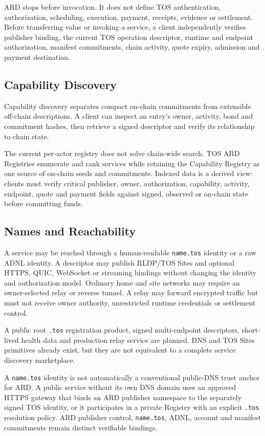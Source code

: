 \documentclass[11pt,oneside]{article}
\begin{document}
ARD stops before invocation. It does not define TOS authentication, authorization, scheduling,
execution, payment, receipts, evidence or settlement. Before transferring value or invoking
a service, a client independently verifies publisher binding, the current TOS operation descriptor,
runtime and endpoint authorization, manifest commitments, chain activity, quote expiry,
admission and payment destination.

\subsection{Capability Discovery}

Capability discovery separates compact on-chain commitments from extensible off-chain
descriptions. A client can inspect an entry's owner, activity, bond and commitment hashes,
then retrieve a signed descriptor and verify its relationship to chain state.

The current per-actor registry does not solve chain-wide search. TOS ARD Registries enumerate
and rank services while retaining the Capability Registry as one source of on-chain seeds and
commitments. Indexed data is a derived view: clients must verify critical publisher, owner,
authorization, capability, activity, endpoint, quote and payment fields against signed,
observed or on-chain state before committing funds.

\subsection{Names and Reachability}

A service may be reached through a human-readable \texttt{name.tos} identity or a raw ADNL
identity. A descriptor may publish RLDP/TOS Sites and optional HTTPS, QUIC, WebSocket or
streaming bindings without changing the identity and authorization model. Ordinary home and
site networks may require an owner-selected relay or reverse tunnel. A relay may forward
encrypted traffic but must not receive owner authority, unrestricted runtime credentials or
settlement control.

A public root \texttt{.tos} registration product, signed multi-endpoint descriptors,
short-lived health data and production relay service are planned. DNS and TOS Sites
primitives already exist, but they are not equivalent to a complete service discovery
marketplace.

A \texttt{name.tos} identity is not automatically a conventional public-DNS trust anchor for
ARD. A public service without its own DNS domain uses an approved HTTPS gateway that binds an
ARD publisher namespace to the separately signed TOS identity, or it participates in a
private Registry with an explicit \texttt{.tos} resolution policy. ARD publisher control,
\texttt{name.tos}, ADNL, account and manifest commitments remain distinct verifiable
bindings.
\end{document}
